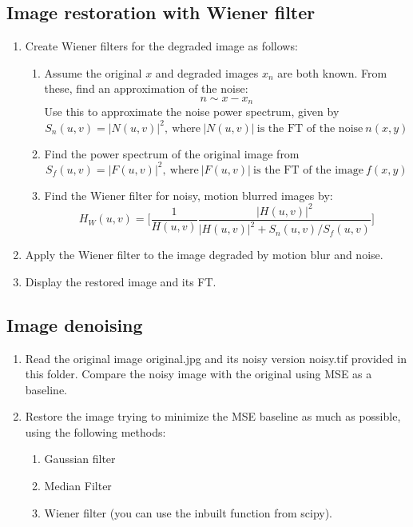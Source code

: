\documentclass[a4paper]{article}
\begin{document}
\subsection{Image restoration with Wiener filter}

\begin{enumerate}
\item  Create Wiener filters for the degraded image as follows:
\begin{enumerate}
\item Assume the original $x$ and degraded images $x_n$ are both known. From these, find an approximation of the noise:
$$ n \sim x-x_n$$
Use this to approximate the noise power spectrum, given by 
$$ S_{n}(u,v)=|N(u,v)|^2,~\textrm{where}~|N(u,v)|~\textrm{is the FT of the noise} ~n(x,y)$$
\item Find the power spectrum of the original image from 
$$S_{f}(u,v)= |F(u,v)|^2,~\textrm{where}~|F(u,v)|~\textrm{is the FT of the image} ~f(x,y)$$
\item Find the Wiener filter for noisy, motion blurred images by:
$$ H_W(u,v) = \biggl[ \frac{1}{H(u,v)} \frac{|H(u,v)|^2}{|H(u,v)|^2 + S_n(u,v)/S_f(u,v)}  \biggr]$$
\end{enumerate}
\item Apply the Wiener filter to the image degraded by motion blur and noise. 
\item Display the restored image and its FT.
\end{enumerate}



\subsection{Image denoising}

\begin{enumerate}
\item Read the original image original.jpg and its noisy version noisy.tif provided in this folder. Compare the noisy image with the original using MSE as a baseline.
\item Restore the image trying to minimize the MSE baseline as much as possible, using the following methods:
\begin{enumerate}
\item Gaussian filter
\item Median Filter
\item Wiener filter (you can use the inbuilt function from scipy).
\end{enumerate}
\end{enumerate}
\end{document}
